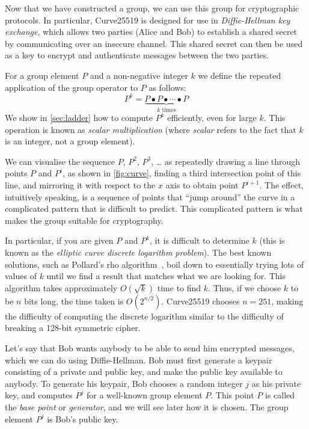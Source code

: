 \documentclass{article}
\begin{document}
Now that we have constructed a group, we can use this group for cryptographic protocols.
In particular, Curve25519 is designed for use in \emph{Diffie-Hellman key exchange}, which allows two parties (Alice and Bob) to establish a shared secret by communicating over an insecure channel.
This shared secret can then be used as a key to encrypt and authenticate messages between the two parties.

For a group element $P$ and a non-negative integer $k$ we define the repeated application of the group operator to $P$ as follows:
\begin{equation}
P^k = \underbrace{P \bullet P \bullet \cdots \bullet P}_\text{$k$ times}
\end{equation}
We show in \autoref{sec:ladder} how to compute $P^k$ efficiently, even for large $k$.
This operation is known as \emph{scalar multiplication} (where \emph{scalar} refers to the fact that $k$ is an integer, not a group element).

We can visualise the sequence $P$, $P^2$, $P^3$, {\dots} as repeatedly drawing a line through points $P$ and $P^i$, as shown in \autoref{fig:curve}, finding a third intersection point of this line, and mirroring it with respect to the $x$ axis to obtain point $P^{i+1}$.
The effect, intuitively speaking, is a sequence of points that ``jump around'' the curve in a complicated pattern that is difficult to predict.
This complicated pattern is what makes the group suitable for cryptography.

In particular, if you are given $P$ and $P^k$, it is difficult to determine $k$ (this is known as the \emph{elliptic curve discrete logarithm problem}).
The best known solutions, such as Pollard's rho algorithm~\cite{Pollard:1978do}, boil down to essentially trying lots of values of $k$ until we find a result that matches what we are looking for.
This algorithm takes approximately $O(\sqrt{k})$ time to find $k$.
Thus, if we choose $k$ to be $n$ bits long, the time taken is $O(2^{n/2})$.
Curve25519 chooses $n=251$, making the difficulty of computing the discrete logarithm similar to the difficulty of breaking a 128-bit symmetric cipher.

Let's say that Bob wants anybody to be able to send him encrypted messages, which we can do using Diffie-Hellman.
Bob must first generate a keypair consisting of a private and public key, and make the public key available to anybody.
To generate his keypair, Bob chooses a random integer $j$ as his private key, and computes $P^j$ for a well-known group element $P$.
This point $P$ is called the \emph{base point} or \emph{generator}, and we will see later how it is chosen.
The group element $P^j$ is Bob's public key.
\end{document}
